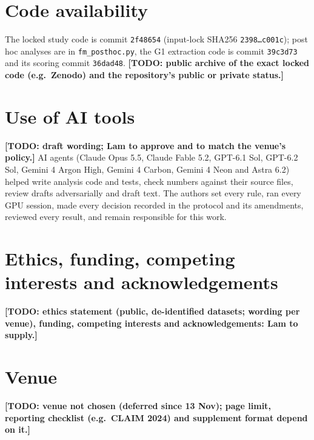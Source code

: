 \documentclass[conference]{IEEEtran}
\newcommand{\todo}[1]{\textbf{[TODO: #1]}}
\begin{document}
\section*{Code availability}
The locked study code is commit \texttt{2f48654} (input-lock SHA256 \texttt{2398\ldots c001c}); post hoc analyses are in \texttt{fm\_posthoc.py}, the G1 extraction code is commit \texttt{39c3d73} and its scoring commit \texttt{36dad48}. \todo{public archive of the exact locked code (e.g.\ Zenodo) and the repository's public or private status.}

\section*{Use of AI tools}
\todo{draft wording; Lam to approve and to match the venue's policy.} AI agents (Claude Opus 5.5, Claude Fable 5.2, GPT-6.1 Sol, GPT-6.2 Sol, Gemini 4 Argon High, Gemini 4 Carbon, Gemini 4 Neon and Astra 6.2) helped write analysis code and tests, check numbers against their source files, review drafts adversarially and draft text. The authors set every rule, ran every GPU session, made every decision recorded in the protocol and its amendments, reviewed every result, and remain responsible for this work.

\section*{Ethics, funding, competing interests and acknowledgements}
\todo{ethics statement (public, de-identified datasets; wording per venue), funding, competing interests and acknowledgements: Lam to supply.}

\section*{Venue}
\todo{venue not chosen (deferred since 13 Nov); page limit, reporting checklist (e.g.\ CLAIM 2024) and supplement format depend on it.}





\end{document}
